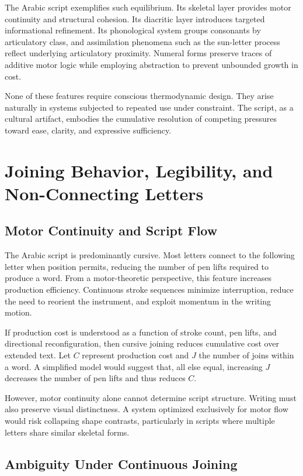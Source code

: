 \documentclass[11pt]{article}
\begin{document}
The Arabic script exemplifies such equilibrium. Its skeletal layer provides motor continuity and structural cohesion. Its diacritic layer introduces targeted informational refinement. Its phonological system groups consonants by articulatory class, and assimilation phenomena such as the sun-letter process reflect underlying articulatory proximity. Numeral forms preserve traces of additive motor logic while employing abstraction to prevent unbounded growth in cost.

None of these features require conscious thermodynamic design. They arise naturally in systems subjected to repeated use under constraint. The script, as a cultural artifact, embodies the cumulative resolution of competing pressures toward ease, clarity, and expressive sufficiency.

\section{Joining Behavior, Legibility, and Non-Connecting Letters}

\subsection{Motor Continuity and Script Flow}

The Arabic script is predominantly cursive. Most letters connect to the following letter when position permits, reducing the number of pen lifts required to produce a word. From a motor-theoretic perspective, this feature increases production efficiency. Continuous stroke sequences minimize interruption, reduce the need to reorient the instrument, and exploit momentum in the writing motion.

If production cost is understood as a function of stroke count, pen lifts, and directional reconfiguration, then cursive joining reduces cumulative cost over extended text. Let $C$ represent production cost and $J$ the number of joins within a word. A simplified model would suggest that, all else equal, increasing $J$ decreases the number of pen lifts and thus reduces $C$.

However, motor continuity alone cannot determine script structure. Writing must also preserve visual distinctness. A system optimized exclusively for motor flow would risk collapsing shape contrasts, particularly in scripts where multiple letters share similar skeletal forms.

\subsection{Ambiguity Under Continuous Joining}
\end{document}
